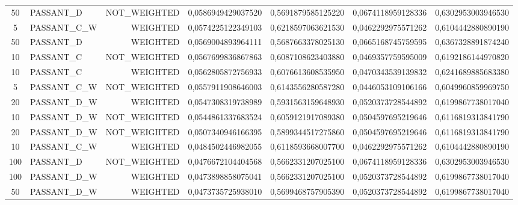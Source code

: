 \begin{table}[H]
{\begin{tabular}{ c l r c c c c }
					50 &  PASSANT\_D & NOT\_WEIGHTED & 0,0586949429037520 & 0,5691879585125220 & 0,0674118959128336 & 0,6302953003946530 \\
					
					5 & PASSANT\_C\_W &   WEIGHTED & 0,0574225122349103 & 0,6218597063621530 & 0,0462292975571262 & 0,6104442880890190 \\
					
					50 &  PASSANT\_D &   WEIGHTED & 0,0569004893964111 & 0,5687663378025130 & 0,0665168745759595 & 0,6367328891874240 \\
					
					10 &  PASSANT\_C & NOT\_WEIGHTED & 0,0567699836867863 & 0,6087108623403880 & 0,0469357759595009 & 0,6192186144970820 \\
					
					10 &  PASSANT\_C &   WEIGHTED & 0,0562805872756933 & 0,6076613608535950 & 0,0470343539139832 & 0,6241689885683380 \\
					
					5 & PASSANT\_C\_W & NOT\_WEIGHTED & 0,0557911908646003 & 0,6143556280587280 & 0,0446053109106166 & 0,6049960859969750 \\
					
					20 & PASSANT\_D\_W &   WEIGHTED & 0,0547308319738989 & 0,5931563159648930 & 0,0520373728544892 & 0,6199867738017040 \\
					
					10 & PASSANT\_D\_W & NOT\_WEIGHTED & 0,0544861337683524 & 0,6059121917089380 & 0,0504597695219646 & 0,6116819313841790 \\
					
					20 & PASSANT\_D\_W & NOT\_WEIGHTED & 0,0507340946166395 & 0,5899344517275860 & 0,0504597695219646 & 0,6116819313841790 \\
					
					10 & PASSANT\_C\_W &   WEIGHTED & 0,0484502446982055 & 0,6118593668007700 & 0,0462292975571262 & 0,6104442880890190 \\
					
					100 &  PASSANT\_D & NOT\_WEIGHTED & 0,0476672104404568 & 0,5662331207025100 & 0,0674118959128336 & 0,6302953003946530 \\
					
					100 & PASSANT\_D\_W &   WEIGHTED & 0,0473898858075041 & 0,5662331207025100 & 0,0520373728544892 & 0,6199867738017040 \\
					
					50 & PASSANT\_D\_W &   WEIGHTED & 0,0473735725938010 & 0,5699468757905390 & 0,0520373728544892 & 0,6199867738017040 \\
					

\end{tabular}}
\end{table}
